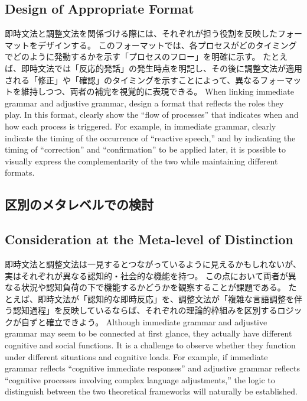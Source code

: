 \documentclass[a4paper,xelatex,ja=standard]{bxjsarticle}
\begin{document}
\subsection{Design of Appropriate Format}
\fi

\ifJPN
即時文法と調整文法を関係づける際には、それぞれが担う役割を反映したフォーマットをデザインする。
このフォーマットでは、各プロセスがどのタイミングでどのように発動するかを示す「プロセスのフロー」を明確に示す。
たとえば、即時文法では「反応的発話」の発生時点を明記し、その後に調整文法が適用される「修正」や「確認」のタイミングを示すことによって、異なるフォーマットを維持しつつ、両者の補完を視覚的に表現できる。
\else
When linking immediate grammar and adjustive grammar, design a format that reflects the roles they play.
In this format, clearly show the ``flow of processes'' that indicates when and how each process is triggered.
For example, in immediate grammar, clearly indicate the timing of the occurrence of ``reactive speech,'' and by indicating the timing of ``correction'' and ``confirmation'' to be applied later, it is possible to visually express the complementarity of the two while maintaining different formats.
\fi

\ifJPN
\subsection{区別のメタレベルでの検討}
\else
\subsection{Consideration at the Meta-level of Distinction}
\fi
  
\ifJPN
即時文法と調整文法は一見するとつながっているように見えるかもしれないが、実はそれぞれが異なる認知的・社会的な機能を持つ。
この点において両者が異なる状況や認知負荷の下で機能するかどうかを観察することが課題である。
たとえば、即時文法が「認知的な即時反応」を、調整文法が「複雑な言語調整を伴う認知過程」を反映しているならば、それぞれの理論的枠組みを区別するロジックが自ずと確立できよう。
\else
Although immediate grammar and adjustive grammar may seem to be connected at first glance, they actually have different cognitive and social functions.
It is a challenge to observe whether they function under different situations and cognitive loads.
For example, if immediate grammar reflects ``cognitive immediate responses'' and adjustive grammar reflects ``cognitive processes involving complex language adjustments,'' the logic to distinguish between the two theoretical frameworks will naturally be established.
\fi
\end{document}

